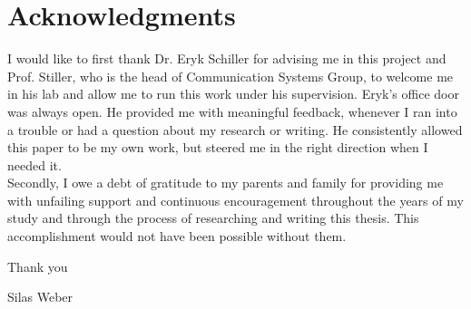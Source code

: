 \chapter*{Acknowledgments}

I would like to first thank Dr. Eryk Schiller for advising me in this project and Prof. Stiller, who is the head of Communication Systems Group, to welcome me in his lab and allow me to run this work under his supervision.
Eryk's office door was always open. He provided me with meaningful feedback, whenever I ran into a trouble or had a question about my research or writing.
He consistently allowed this paper to be my own work, but steered me in the right direction when I needed it.
\\
Secondly, I owe a debt of gratitude to my parents and family for providing me with unfailing support and continuous encouragement throughout the years of my study and through the process of researching and writing this thesis. 
This accomplishment would not have been possible without them. 

\vspace{.5cm}
Thank you

\vspace{1cm}
Silas Weber
